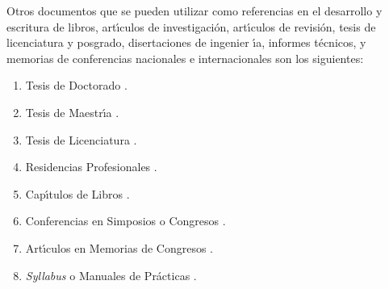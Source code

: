 Otros documentos que se pueden utilizar como referencias en el desarrollo y
escritura de libros, art\'{\i}culos de investigaci\'{o}n, art\'{\i}culos de
revisi\'{o}n, tesis de licenciatura y posgrado, disertaciones de ingenier%
\'{\i}a, informes t\'{e}cnicos, y memorias de conferencias nacionales e
internacionales son los siguientes:

\begin{enumerate}
\item Tesis de Doctorado \cite{ValleScD}.

\item Tesis de Maestr\'{\i}a \cite{ValleMC}.

\item Tesis de Licenciatura \cite{ValleENG}.

\item Residencias Profesionales \cite{ValleRES}.

\item Cap\'{\i}tulos de Libros \cite{Byers(2009)}.

\item Conferencias en Simposios o Congresos \cite{BEER(2020)}.

\item Art\'{\i}culos en Memorias de Congresos \cite{Korobeinikov(2017)}.

\item \textit{Syllabus} o Manuales de Pr\'{a}cticas \cite{biomath}.
\end{enumerate}
